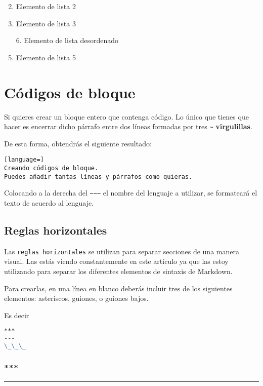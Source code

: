 \begin{enumerate}
\setcounter{enumi}{1}
\item Elemento de lista 2
\item  Elemento de lista 3
\item[6.] Elemento de lista desordenado
\item Elemento de lista 5
\end{enumerate}

\chapter{Códigos de bloque}

Si quieres crear un bloque entero que contenga código. Lo único que tienes que hacer es encerrar dicho párrafo entre dos líneas formadas por tres \lstinline{~} \textbf{virgulillas}.

De esta forma, obtendrás el siguiente resultado:

\begin{lstlisting}[language=]
Creando códigos de bloque.
Puedes añadir tantas líneas y párrafos como quieras.  
\end{lstlisting}

Colocando a la derecha del \lstinline{~~~} el nombre del lenguaje a utilizar, se formateará el texto de acuerdo al lenguaje.

\section{Reglas horizontales}

Las \lstinline{reglas horizontales} se utilizan para separar secciones de una manera visual. Las estás viendo constantemente en este artículo ya que las estoy utilizando para separar los diferentes elementos de sintaxis de Markdown.

Para crearlas, en una línea en blanco deberás incluir tres de los siguientes elementos: asteriscos, guiones, o guiones bajos.

Es decir

\begin{lstlisting}[language= md]
***
---
\_\_\_
\end{lstlisting}

\subsection{***}
\par\noindent\rule{\textwidth}{0.4pt}

